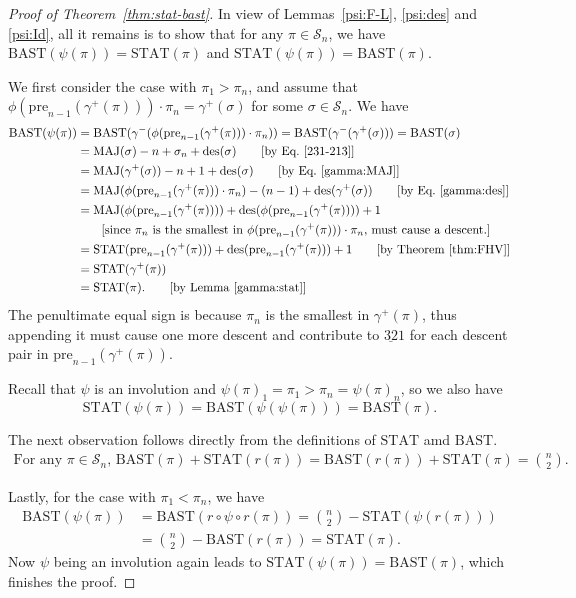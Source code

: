 \documentclass[12pt]{amsart}
\numberwithin{equation}{section}
\theoremstyle{plain}
\theoremstyle{definition}
\def\MAJ{\mathrm{MAJ}}
\def\STAT{\mathrm{STAT}}
\def\BAST{\mathrm{BAST}}
\def\des{\mathrm{des}}
\def\pre{\mathrm{pre}}
\def\SS{\mathcal{S}}
\begin{document}
\begin{proof}[Proof of Theorem~\ref{thm:stat-bast}]
In view of Lemmas~\ref{psi:F-L}, \ref{psi:des} and \ref{psi:Id}, all it remains is to show that for any $\pi\in\SS_n$, we have $\BAST(\psi(\pi))=\STAT(\pi)$ and $\STAT(\psi(\pi))=\BAST(\pi)$.

We first consider the case with $\pi_1>\pi_n$, and assume that $\phi(\pre_{n-1}(\gamma^{+}(\pi)))\cdot \pi_n=\gamma^+(\sigma)$ for some $\sigma\in\SS_n$. We have
\begin{align*}
\BAST(\psi(\pi))&=\BAST(\gamma^-(\phi(\pre_{n-1}(\gamma^{+}(\pi)))\cdot \pi_n))=\BAST(\gamma^-(\gamma^+(\sigma)))=\BAST(\sigma)\\
&=\MAJ(\sigma)-n+\sigma_n+\des(\sigma) \qquad [\text{by Eq.~\eqref{231-213}}]\\
&=\MAJ(\gamma^+(\sigma))-n+1+\des(\sigma)\qquad [\text{by Eq.~\eqref{gamma:MAJ}}]\\
&=\MAJ(\phi(\pre_{n-1}(\gamma^{+}(\pi)))\cdot \pi_n)-(n-1)+\des(\gamma^+(\sigma))\qquad [\text{by Eq.~\eqref{gamma:des}}]\\
&=\MAJ(\phi(\pre_{n-1}(\gamma^{+}(\pi))))+\des(\phi(\pre_{n-1}(\gamma^{+}(\pi))))+1\\
& \qquad [\text{since $\pi_n$ is the smallest in $\phi(\pre_{n-1}(\gamma^{+}(\pi)))\cdot \pi_n$, must cause a descent.}]\\
&=\STAT(\pre_{n-1}(\gamma^+(\pi)))+\des(\pre_{n-1}(\gamma^+(\pi)))+1\qquad [\text{by Theorem~\ref{thm:FHV}}]\\
&=\STAT(\gamma^+(\pi))\\
&=\STAT(\pi). \qquad [\text{by Lemma~\ref{gamma:stat}}]
\end{align*}
The penultimate equal sign is because $\pi_n$ is the smallest in $\gamma^{+}(\pi)$, thus appending it must cause one more descent and contribute to $\underline{32}1$ for each descent pair in $\pre_{n-1}(\gamma^+(\pi))$.

Recall that $\psi$ is an involution and $\psi(\pi)_1=\pi_1>\pi_n=\psi(\pi)_n$, so we also have
$$\STAT(\psi(\pi))=\BAST(\psi(\psi(\pi)))=\BAST(\pi).$$

The next observation follows directly from the definitions of $\STAT$ amd $\BAST$.
\begin{align*}
\text{For any $\pi\in\SS_n$, }\BAST(\pi)+\STAT(r(\pi))=\BAST(r(\pi))+\STAT(\pi)=\binom{n}{2}.
\end{align*}

Lastly, for the case with $\pi_1<\pi_n$, we have
\begin{align*}
\BAST(\psi(\pi))&=\BAST(r\circ\psi\circ r(\pi))=\binom{n}{2}-\STAT(\psi(r(\pi)))\\
&=\binom{n}{2}-\BAST(r(\pi))=\STAT(\pi).
\end{align*}
Now $\psi$ being an involution again leads to $\STAT(\psi(\pi))=\BAST(\pi)$, which finishes the proof.
\end{proof}
\end{document}
